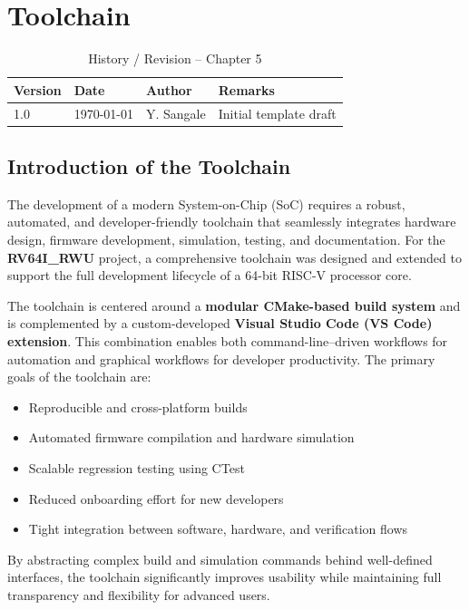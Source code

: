 \chapter{Toolchain}
\label{chap:toolchain}

\begin{table}[H]
\caption{History / Revision – Chapter 5}
\label{tab:history-ch1}
\centering
\begin{tabular}{llll}
\toprule
Version & Date & Author & Remarks \\
\midrule
1.0 & \today & Y. Sangale & Initial template draft \\
\bottomrule
\end{tabular}
\end{table}

\section{Introduction of the Toolchain}



The development of a modern System-on-Chip (SoC) requires a robust, automated, and developer-friendly toolchain that seamlessly integrates hardware design, firmware development, simulation, testing, and documentation.  
For the \textbf{RV64I\_RWU} project, a comprehensive toolchain was designed and extended to support the full development lifecycle of a 64-bit RISC-V processor core.

The toolchain is centered around a \textbf{modular CMake-based build system} and is complemented by a custom-developed \textbf{Visual Studio Code (VS Code) extension}.  
This combination enables both command-line–driven workflows for automation and graphical workflows for developer productivity. The primary goals of the toolchain are:

\begin{itemize}
    \item Reproducible and cross-platform builds
    \item Automated firmware compilation and hardware simulation
    \item Scalable regression testing using CTest
    \item Reduced onboarding effort for new developers
    \item Tight integration between software, hardware, and verification flows
\end{itemize}

By abstracting complex build and simulation commands behind well-defined interfaces, the toolchain significantly improves usability while maintaining full transparency and flexibility for advanced users.

